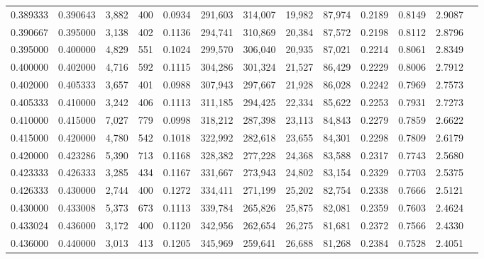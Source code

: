 \begin{tabular}{rrrrrrrrrrrrr}
0.389333 & 0.390643 &  3,882 &   400 &                                     0.0934 & 291,603 & 314,007 &  19,982 &  87,974 & 0.2189 & 0.8149 & 2.9087 \\
0.390667 & 0.395000 &  3,138 &   402 &                                     0.1136 & 294,741 & 310,869 &  20,384 &  87,572 & 0.2198 & 0.8112 & 2.8796 \\
0.395000 & 0.400000 &  4,829 &   551 &                                     0.1024 & 299,570 & 306,040 &  20,935 &  87,021 & 0.2214 & 0.8061 & 2.8349 \\
0.400000 & 0.402000 &  4,716 &   592 &                                     0.1115 & 304,286 & 301,324 &  21,527 &  86,429 & 0.2229 & 0.8006 & 2.7912 \\
0.402000 & 0.405333 &  3,657 &   401 &                                     0.0988 & 307,943 & 297,667 &  21,928 &  86,028 & 0.2242 & 0.7969 & 2.7573 \\
0.405333 & 0.410000 &  3,242 &   406 &                                     0.1113 & 311,185 & 294,425 &  22,334 &  85,622 & 0.2253 & 0.7931 & 2.7273 \\
0.410000 & 0.415000 &  7,027 &   779 &                                     0.0998 & 318,212 & 287,398 &  23,113 &  84,843 & 0.2279 & 0.7859 & 2.6622 \\
0.415000 & 0.420000 &  4,780 &   542 &                                     0.1018 & 322,992 & 282,618 &  23,655 &  84,301 & 0.2298 & 0.7809 & 2.6179 \\
0.420000 & 0.423286 &  5,390 &   713 &                                     0.1168 & 328,382 & 277,228 &  24,368 &  83,588 & 0.2317 & 0.7743 & 2.5680 \\
0.423333 & 0.426333 &  3,285 &   434 &                                     0.1167 & 331,667 & 273,943 &  24,802 &  83,154 & 0.2329 & 0.7703 & 2.5375 \\
0.426333 & 0.430000 &  2,744 &   400 &                                     0.1272 & 334,411 & 271,199 &  25,202 &  82,754 & 0.2338 & 0.7666 & 2.5121 \\
0.430000 & 0.433008 &  5,373 &   673 &                                     0.1113 & 339,784 & 265,826 &  25,875 &  82,081 & 0.2359 & 0.7603 & 2.4624 \\
0.433024 & 0.436000 &  3,172 &   400 &                                     0.1120 & 342,956 & 262,654 &  26,275 &  81,681 & 0.2372 & 0.7566 & 2.4330 \\
0.436000 & 0.440000 &  3,013 &   413 &                                     0.1205 & 345,969 & 259,641 &  26,688 &  81,268 & 0.2384 & 0.7528 & 2.4051 \\

\end{tabular}
